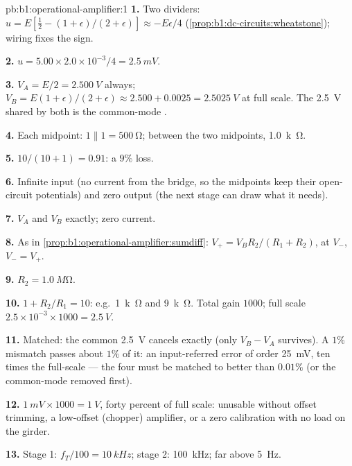 \begin{solution}{pb:b1:operational-amplifier:1}
\textbf{1.} Two dividers: $u = E[\tfrac12 - (1 + \epsilon)/(2 + \epsilon)]
\approx -E\epsilon/4$ (\cref{prop:b1:dc-circuits:wheatstone}); wiring
fixes the sign.

\textbf{2.} $u = 5.00 \times 2.0\times10^{-3}/4 = \qty{2.5}{mV}$.

\textbf{3.} $V_A = E/2 = \qty{2.500}{V}$ always; $V_B = E(1 + \epsilon)/(2 +
\epsilon) \approx 2.500 + 0.0025 = \qty{2.5025}{V}$ at full scale. The
\qty{2.5}{V} shared by both is the common-mode .

\textbf{4.} Each midpoint: $1 \parallel 1 = \qty{500}{\ohm}$; between the
two midpoints, \qty{1.0}{k\ohm}.

\textbf{5.} $10/(10 + 1) = 0.91$: a $9\%$ loss.

\textbf{6.} Infinite input  (no current from the bridge, so
the midpoints keep their open-circuit potentials) and zero output
 (the next stage can draw what it needs).

\textbf{7.} $V_A$ and $V_B$ exactly; zero current.

\textbf{8.} As in \cref{prop:b1:operational-amplifier:sumdiff}: $V_+ =
V_BR_2/(R_1 + R_2)$,  at $V_-$, $V_- = V_+$.

\textbf{9.} $R_2 = \qty{1.0}{M\ohm}$.

\textbf{10.} $1 + R_2/R_1 = 10$: e.g.\ \qty{1}{k\ohm} and \qty{9}{k\ohm}.
Total gain $1000$; full scale $2.5 \times 10^{-3} \times 1000 = \qty{2.5}{V}$.

\textbf{11.} Matched: the common \qty{2.5}{V} cancels exactly (only
$V_B - V_A$ survives). A $1\%$ mismatch passes about $1\%$ of it: an
input-referred error of order \qty{25}{mV}, ten times the full-scale
 --- the four  must be matched to better than $0.01\%$
(or the common-mode  removed first).

\textbf{12.} $1\ \unit{mV} \times 1000 = \qty{1}{V}$, forty percent of full
scale: unusable without offset trimming, a low-offset (chopper)
amplifier, or a zero calibration with no load on the girder.

\textbf{13.} Stage 1: $f_T/100 = \qty{10}{kHz}$; stage 2: \qty{100}{kHz};
far above \qty{5}{Hz}.


\end{solution}

